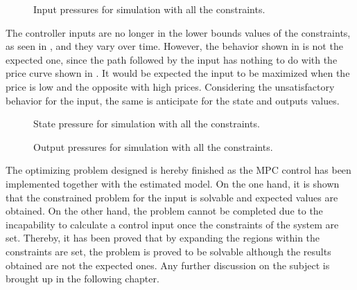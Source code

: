 \begin{figure}[H]
\centering
 
\caption{Input pressures for simulation with all the constraints.}
\label{fig:Output_input}
\end{figure}

The controller inputs are no longer in the lower bounds values of the constraints, as seen in , and they vary over time. However, the behavior shown in  is not the expected one, since the path followed by the input has nothing to do with the price curve shown in . It would be expected the input to be maximized when the price is low and the opposite with high prices. Considering the unsatisfactory behavior for the input, the same is anticipate for the state and outputs values. 

\begin{figure}[H]
\centering
 
\caption{State pressure for simulation with all the constraints.}
\label{fig:Output_input}
\end{figure}

\begin{figure}[H]
\centering
 
\caption{Output pressures for simulation with all the constraints.}
\label{fig:Output_input}
\end{figure}



The optimizing problem designed is hereby finished as the MPC control has been implemented together with the estimated model. On the one hand, it is shown that the constrained problem for the input is solvable and expected values are obtained. On the other hand, the problem cannot be completed due to the incapability to calculate a control input once the constraints of the system are set. Thereby, it has been proved that by expanding the regions within the constraints are set, the problem is proved to be solvable although the results obtained are not the expected ones. Any further discussion on the subject is brought up in the following chapter. 
